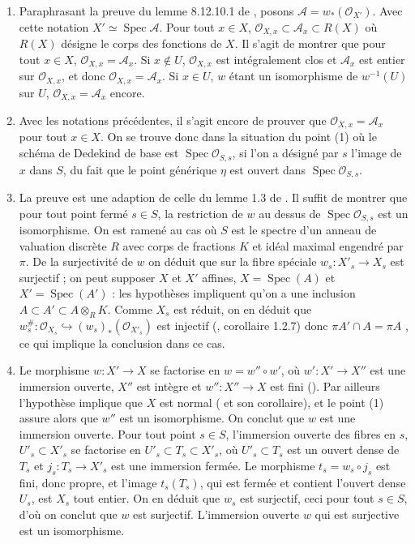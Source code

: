 \documentclass[11pt]{amsart}
\numberwithin{equation}{section}
\theoremstyle{definition}
\theoremstyle{remark}
\newcommand{\dA}{{\mathcal A}}
\newcommand{\dO}{{\mathcal O}}
\DeclareMathOperator{\Spec}{Spec}
\begin{document}
\proof
\leavevmode
\begin{enumerate}

\item \label{1} Paraphrasant la preuve du lemme 8.12.10.1 de \cite{EGAIV-3}, posons $\dA = w_\ast (\dO _{X'})$. Avec cette notation $X' \simeq \Spec \dA$. Pour tout $x\in X$, $\dO _{X,x} \subset \dA _x \subset R(X)$ o\`u $R(X)$ d\'esigne le corps des fonctions de $X$. Il s'agit de montrer que pour tout $x\in X$, $\dO _{X,x} = \dA _x$. Si $x \notin U$, $\dO _{X,x} $ est int\'egralement clos et $\dA _x$ est entier sur $\dO _{X,x}$, et donc $\dO _{X,x} = \dA _x$. Si $x \in U$, $w$ \'etant un isomorphisme de $w^{-1} (U)$ sur $U$, $\dO _{X,x} = \dA _x$ encore.




\item \label{2bis} Avec les notations pr\'ec\'edentes, il s'agit encore de prouver que $\dO _{X,x} = \dA _x$ pour tout $x\in X$. On se trouve donc dans la situation du point (1) o\`u le sch\'ema de Dedekind de base est $\Spec \dO _{S,s}$, si l'on a d\'esign\'e par $s$ l'image de $x$ dans $S$, du fait que le point g\'en\'erique $\eta $ est ouvert dans $\Spec \dO _{S,s}$.



\item \label{3}   La preuve est une adaption de celle du lemme 1.3 de \cite{WWO} . Il suffit de montrer que pour tout point ferm\'e $s\in S$, la restriction de $w$ au dessus de $\Spec \dO _{S,s}$ est un isomorphisme. On est ramen\'e au cas o\`u $S$ est le spectre d'un anneau de valuation discr\`ete  $R$ avec corps de fractions $K$ et id\'eal maximal engendr\'e par $\pi$. De la surjectivit\'e de $w$ on d\'eduit que sur la fibre sp\'eciale $w _s:X'_s\to X_s$ est surjectif ; on peut supposer $X$ et $X'$ affines, $X=\Spec(A)$ et $X'=\Spec(A')$ : les hypoth\`eses impliquent qu'on a une inclusion
$A\subset A'\subset A\otimes_R K$. Comme $X_s$ est r\'eduit, on en d\'eduit que $w_s^{\#}:\dO_{X_s}\hookrightarrow {(w_s)}_*(\dO_{X'_s})$ est injectif (\cite{EGAI}, corollaire 1.2.7) donc $\pi A'\cap A= \pi A$ , ce qui implique la conclusion dans ce cas.



\item \label{4}  Le morphisme $w: X' \to X$ se factorise en $w= w'' \circ w'$, o\`u $w' : X' \to X''$ est une immersion ouverte, $X''$ est int\`egre et $w'' :X'' \to X$ est fini (\cite[Lemma 36.38.3, Zariski's main theorem, Tag 05K0]{ST}). Par ailleurs l'hypoth\`ese implique que $X$ est normal (\cite[ Theorem 23.9]{Mat} et son corollaire), et le point (1) assure alors que $w''$ est un isomorphisme. On conclut que $w$ est une immersion ouverte. Pour tout point $s\in S$, l'immersion ouverte des fibres en $s$, $U'_s \subset X'_s$ se factorise en $U'_s \subset T_s \subset X'_s$, o\`u $U'_s \subset T_s$ est un ouvert dense de $T_s$ et $j_s :T_s \to X'_s$ est une immersion ferm\'ee. Le morphisme $t_s= w_s \circ j_s$ est fini, donc  propre, et l'image $t_s(T_s)$, qui est ferm\'ee et contient l'ouvert dense $U_s$, est $X_s$ tout entier. On en d\'eduit que $w_s$ est surjectif, ceci pour tout $s\in S$, d'o\`u on conclut que $w$ est surjectif. L'immersion ouverte $w$ qui est surjective est un isomorphisme.



\end{enumerate}
\end{document}
